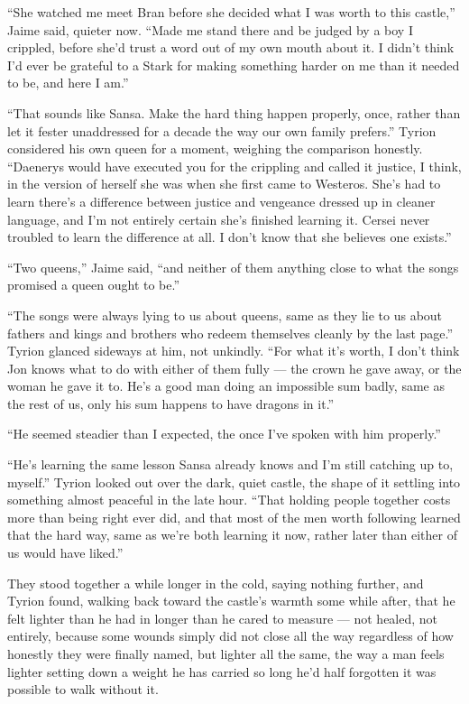 “She watched me meet Bran before she decided what I was worth to this castle,” Jaime said, quieter now. “Made me stand there and be judged by a boy I crippled, before she’d trust a word out of my own mouth about it. I didn’t think I’d ever be grateful to a Stark for making something harder on me than it needed to be, and here I am.”

“That sounds like Sansa. Make the hard thing happen properly, once, rather than let it fester unaddressed for a decade the way our own family prefers.” Tyrion considered his own queen for a moment, weighing the comparison honestly. “Daenerys would have executed you for the crippling and called it justice, I think, in the version of herself she was when she first came to Westeros. She’s had to learn there’s a difference between justice and vengeance dressed up in cleaner language, and I’m not entirely certain she’s finished learning it. Cersei never troubled to learn the difference at all. I don’t know that she believes one exists.”

“Two queens,” Jaime said, “and neither of them anything close to what the songs promised a queen ought to be.”

“The songs were always lying to us about queens, same as they lie to us about fathers and kings and brothers who redeem themselves cleanly by the last page.” Tyrion glanced sideways at him, not unkindly. “For what it’s worth, I don’t think Jon knows what to do with either of them fully — the crown he gave away, or the woman he gave it to. He’s a good man doing an impossible sum badly, same as the rest of us, only his sum happens to have dragons in it.”

“He seemed steadier than I expected, the once I’ve spoken with him properly.”

“He’s learning the same lesson Sansa already knows and I’m still catching up to, myself.” Tyrion looked out over the dark, quiet castle, the shape of it settling into something almost peaceful in the late hour. “That holding people together costs more than being right ever did, and that most of the men worth following learned that the hard way, same as we’re both learning it now, rather later than either of us would have liked.”

\sceneBreak

They stood together a while longer in the cold, saying nothing further, and Tyrion found, walking back toward the castle’s warmth some while after, that he felt lighter than he had in longer than he cared to measure — not healed, not entirely, because some wounds simply did not close all the way regardless of how honestly they were finally named, but lighter all the same, the way a man feels lighter setting down a weight he has carried so long he’d half forgotten it was possible to walk without it.